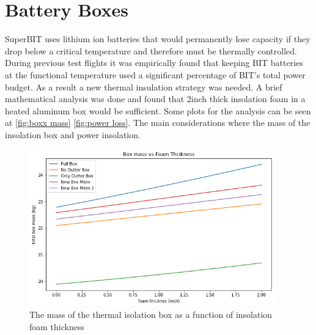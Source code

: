 \section{Battery Boxes}
SuperBIT uses lithium ion batteries that would permanently lose capacity if they drop below a critical temperature and therefore must be thermally controlled. During previous test flights it was empirically found that keeping BIT batteries at the functional temperature used a significant percentage of BIT's total power budget. As a result a new thermal insulation strategy was needed. A brief mathematical analysis was done and found that 2inch thick insolation foam in a heated aluminum box would be sufficient. Some plots for the analysis can be seen at \autoref{fig:boxx mass} \autoref{fig:power loss}. The main considerations where the mass of the insolation box and power insolation. 

\begin{figure}
    \begin{small}
        \begin{center}
            \includegraphics[width=0.95\textwidth]{Hardware/figs/battery_box_mass.png}
        \end{center}
        \caption{The mass of the thermal isolation box as a function of insolation foam thickness}
        \label{fig:boxx mass}
    \end{small}
\end{figure}

